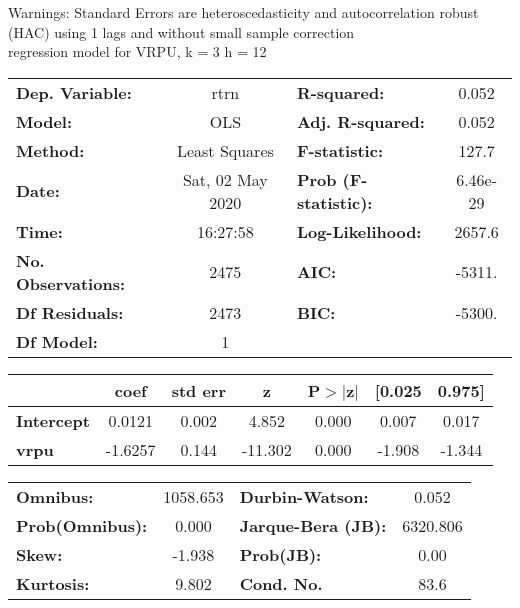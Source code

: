 Warnings: \newline
 [1] Standard Errors are heteroscedasticity and autocorrelation robust (HAC) using 1 lags and without small sample correction\\ 

regression model for VRPU, k = 3 h = 12\begin{center}
\begin{tabular}{lclc}
\toprule
\textbf{Dep. Variable:}    &       rtrn       & \textbf{  R-squared:         } &     0.052   \\
\textbf{Model:}            &       OLS        & \textbf{  Adj. R-squared:    } &     0.052   \\
\textbf{Method:}           &  Least Squares   & \textbf{  F-statistic:       } &     127.7   \\
\textbf{Date:}             & Sat, 02 May 2020 & \textbf{  Prob (F-statistic):} &  6.46e-29   \\
\textbf{Time:}             &     16:27:58     & \textbf{  Log-Likelihood:    } &    2657.6   \\
\textbf{No. Observations:} &        2475      & \textbf{  AIC:               } &    -5311.   \\
\textbf{Df Residuals:}     &        2473      & \textbf{  BIC:               } &    -5300.   \\
\textbf{Df Model:}         &           1      & \textbf{                     } &             \\
\bottomrule
\end{tabular}
\begin{tabular}{lcccccc}
                   & \textbf{coef} & \textbf{std err} & \textbf{z} & \textbf{P$> |$z$|$} & \textbf{[0.025} & \textbf{0.975]}  \\
\midrule
\textbf{Intercept} &       0.0121  &        0.002     &     4.852  &         0.000        &        0.007    &        0.017     \\
\textbf{vrpu}      &      -1.6257  &        0.144     &   -11.302  &         0.000        &       -1.908    &       -1.344     \\
\bottomrule
\end{tabular}
\begin{tabular}{lclc}
\textbf{Omnibus:}       & 1058.653 & \textbf{  Durbin-Watson:     } &    0.052  \\
\textbf{Prob(Omnibus):} &   0.000  & \textbf{  Jarque-Bera (JB):  } & 6320.806  \\
\textbf{Skew:}          &  -1.938  & \textbf{  Prob(JB):          } &     0.00  \\
\textbf{Kurtosis:}      &   9.802  & \textbf{  Cond. No.          } &     83.6  \\
\bottomrule
\end{tabular}
\end{center}

